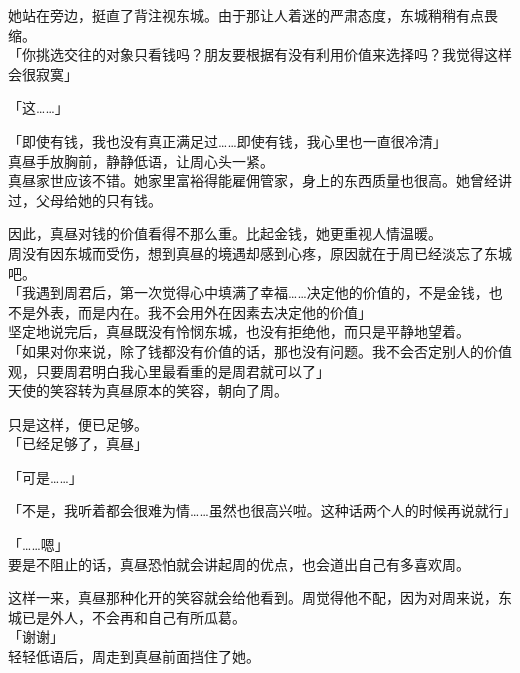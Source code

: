 她站在旁边，挺直了背注视东城。由于那让人着迷的严肃态度，东城稍稍有点畏缩。\\

「你挑选交往的对象只看钱吗？朋友要根据有没有利用价值来选择吗？我觉得这样会很寂寞」

「这……」

「即使有钱，我也没有真正满足过……即使有钱，我心里也一直很冷清」\\

真昼手放胸前，静静低语，让周心头一紧。\\

真昼家世应该不错。她家里富裕得能雇佣管家，身上的东西质量也很高。她曾经讲过，父母给她的只有钱。

因此，真昼对钱的价值看得不那么重。比起金钱，她更重视人情温暖。\\

周没有因东城而受伤，想到真昼的境遇却感到心疼，原因就在于周已经淡忘了东城吧。\\

「我遇到周君后，第一次觉得心中填满了幸福……决定他的价值的，不是金钱，也不是外表，而是内在。我不会用外在因素去决定他的价值」\\

坚定地说完后，真昼既没有怜悯东城，也没有拒绝他，而只是平静地望着。\\

「如果对你来说，除了钱都没有价值的话，那也没有问题。我不会否定别人的价值观，只要周君明白我心里最看重的是周君就可以了」\\

天使的笑容转为真昼原本的笑容，朝向了周。

只是这样，便已足够。\\

「已经足够了，真昼」

「可是……」

「不是，我听着都会很难为情……虽然也很高兴啦。这种话两个人的时候再说就行」

「……嗯」\\

要是不阻止的话，真昼恐怕就会讲起周的优点，也会道出自己有多喜欢周。

这样一来，真昼那种化开的笑容就会给他看到。周觉得他不配，因为对周来说，东城已是外人，不会再和自己有所瓜葛。\\

「谢谢」\\

轻轻低语后，周走到真昼前面挡住了她。\\

